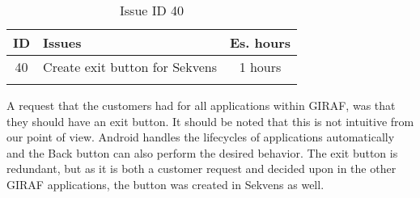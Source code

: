 \begin{longtable} { | c | p{12cm} | c | } 
\hline
	ID 	&	Issues	&		 Es. hours \\\hline
	40	&	Create exit button for Sekvens	&	1 hours \\\hline
\caption{Issue ID 40}
\label{tab:spr3_createexitbutton}
\end{longtable}

A request that the customers had for all applications within GIRAF, was that they should have an exit button. It should be noted that this is not intuitive from our point of view. Android handles the lifecycles of applications automatically\cite{Lifecycle} and the Back button can also perform the desired behavior. The exit button is redundant, but as it is both a customer request and decided upon in the other GIRAF applications, the button was created in Sekvens as well.
